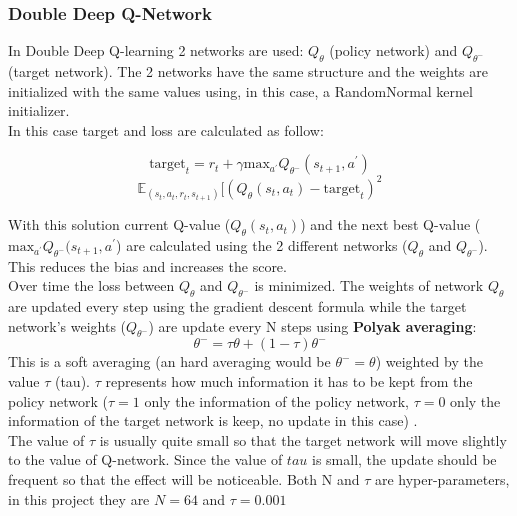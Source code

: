 \documentclass[14pt]{extarticle}
\def\sp{\vspace{5pt}}
\def\pp{\vspace{10pt}\newline}
\begin{document}
\begin{flushleft}
	\subsubsection{Double Deep Q-Network} \label{DDQN}
	\sp
	In Double Deep Q-learning 2 networks are used: $Q_{\theta}$ (policy network) and $Q_{\theta^{-}}$ (target network). The 2 networks have the same structure and the weights are initialized with the same values using, in this case, a RandomNormal kernel initializer. \\
	In this case target and loss are calculated as follow:

\[\text{target}_t = r_t + \gamma\text{max}_{a^\prime}Q_{\theta^{-}}(s_{t+1},a^{\prime})\]
\[\mathbb{E}_{(s_t,a_t,r_t,s_{t+1})}[(Q_{\theta}(s_t,a_t) - \text{target}_t)^2\] 

With this solution current Q-value ($Q_{\theta}(s_t,a_t)$) and the next best Q-value ($\text{max}_{a^\prime}Q_{\theta^{-}}(s_{t+1},a^{\prime}$) are calculated using the 2 different networks ($Q_{\theta}$ and $Q_{\theta^{-}}$). This reduces the bias and increases the score.
\\
Over time the loss between $Q_{\theta}$ and $Q_{\theta^{-}}$ is minimized. The weights of network $Q_{\theta}$ are updated every step using the gradient descent formula while the target network's weights ($Q_{\theta^{-}}$) are update every N steps using \textbf{Polyak averaging}: 
\begin{equation} \label{eq:updateweights}
 \theta^{-} = \tau\theta + (1-\tau)\theta^{-} 
 \end{equation}
This is a soft averaging (an hard averaging would be $\theta^{-}=\theta$) weighted by the value $\tau$ (tau). $\tau$ represents how much information it has to be kept from the policy network ($\tau=1$ only the information of the policy network, $\tau=0$ only the information of the target network is keep, no update in this case) \cite{DDQN1,DDQN2}. \\
The value of $\tau$ is usually quite small so that the target network will move slightly to the value of Q-network. Since the value of $tau$ is small, the update should be frequent so that the effect will be noticeable.
\pp
Both N and $\tau$ are hyper-parameters, in this project they are $N=64$ and $\tau=0.001$
\begin{figure}[H]
\begin{center}
	\begin{tikzpicture}[x=25mm, y=0.09\textwidth, >=stealth]
	

\end{tikzpicture}
\end{center}
\end{figure}
\end{flushleft}
\end{document}

